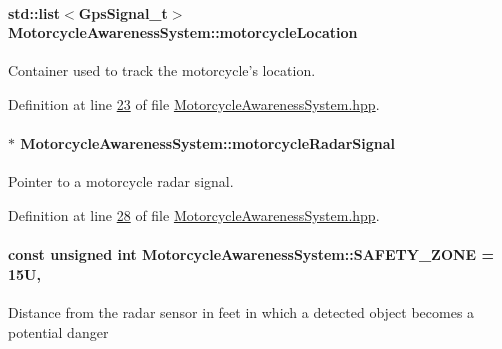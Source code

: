 \hypertarget{classMotorcycleAwarenessSystem_af6becfeb1d11b467cb80a94a8e6940ac}{
\paragraph[{motorcycle\-Location}]{\setlength{\rightskip}{0pt plus 5cm}std\-::list$<${\bf Gps\-Signal\-\_\-t}$>$ Motorcycle\-Awareness\-System\-::motorcycle\-Location\hspace{0.3cm}{\ttfamily [private]}}}\label{classMotorcycleAwarenessSystem_af6becfeb1d11b467cb80a94a8e6940ac}


Container used to track the motorcycle's location. 



Definition at line \hyperlink{MotorcycleAwarenessSystem_8hpp_source_l00023}{23} of file \hyperlink{MotorcycleAwarenessSystem_8hpp_source}{Motorcycle\-Awareness\-System.\-hpp}.

\hypertarget{classMotorcycleAwarenessSystem_a0744e71b9f440a86f5078c876ba7629b}{
\paragraph[{motorcycle\-Radar\-Signal}]{$\ast$ Motorcycle\-Awareness\-System\-::motorcycle\-Radar\-Signal\hspace{0.3cm}{\ttfamily [private]}}}\label{classMotorcycleAwarenessSystem_a0744e71b9f440a86f5078c876ba7629b}


Pointer to a motorcycle radar signal. 



Definition at line \hyperlink{MotorcycleAwarenessSystem_8hpp_source_l00028}{28} of file \hyperlink{MotorcycleAwarenessSystem_8hpp_source}{Motorcycle\-Awareness\-System.\-hpp}.

\hypertarget{classMotorcycleAwarenessSystem_a131c99d85b78020f94fe14bd397f3a6e}{
\paragraph[{S\-A\-F\-E\-T\-Y\-\_\-\-Z\-O\-N\-E}]{\setlength{\rightskip}{0pt plus 5cm}const unsigned int Motorcycle\-Awareness\-System\-::\-S\-A\-F\-E\-T\-Y\-\_\-\-Z\-O\-N\-E = 15\-U\hspace{0.3cm}{\ttfamily [static]}, {\ttfamily [private]}}}\label{classMotorcycleAwarenessSystem_a131c99d85b78020f94fe14bd397f3a6e}
Distance from the radar sensor in feet in which a detected object becomes a potential danger 

